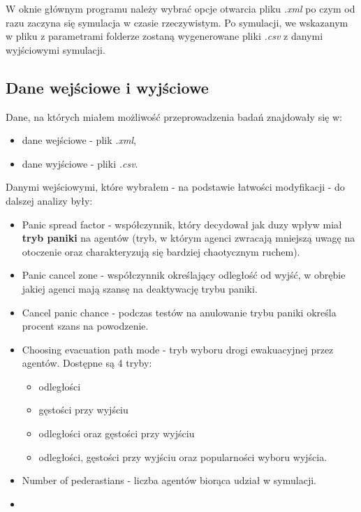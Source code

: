 \documentclass[12pt]{extarticle}
\begin{document}
		W oknie głównym programu należy wybrać opcje otwarcia pliku \textit{.xml} po czym od razu zaczyna się symulacja w czasie rzeczywistym. Po symulacji, we wskazanym w pliku z parametrami folderze zostaną wygenerowane pliki \textit{.csv} z danymi wyjściowymi symulacji.
		
		\subsection{Dane wejściowe i wyjściowe}
		Dane, na których miałem możliwość przeprowadzenia badań znajdowały się w:
		\begin{itemize}
		\item dane wejściowe - plik \textit{.xml},
		\item dane wyjściowe - pliki \textit{.csv}.
		\end{itemize}
		
		Danymi wejściowymi, które wybrałem - na podstawie łatwości modyfikacji - do dalszej analizy były:
		
		\begin{itemize}
		\item Panic spread factor - współczynnik, który decydował jak duzy wpływ miał \textbf{tryb paniki} na agentów (tryb, w którym agenci zwracają mniejszą uwagę na otoczenie oraz charakteryzują się bardziej chaotycznym ruchem).
		\item Panic cancel zone - współczynnik określający odległość od wyjść, w obrębie jakiej agenci mają szansę na deaktywację trybu paniki.
		\item Cancel panic chance - podczas testów na anulowanie trybu paniki określa procent szans na powodzenie.
		\item Choosing evacuation path mode - tryb wyboru drogi ewakuacyjnej przez agentów. Dostępne są 4 tryby:
			\begin{itemize}
			\item odległości
			\item gęstości przy wyjściu
			\item odległości oraz gęstości przy wyjściu
			\item odległości, gęstości przy wyjściu oraz popularności wyboru wyjścia.
			\end{itemize}
		\item Number of pederastians - liczba agentów biorąca udział w symulacji.
		\item 
		\end{itemize}
\end{document}
